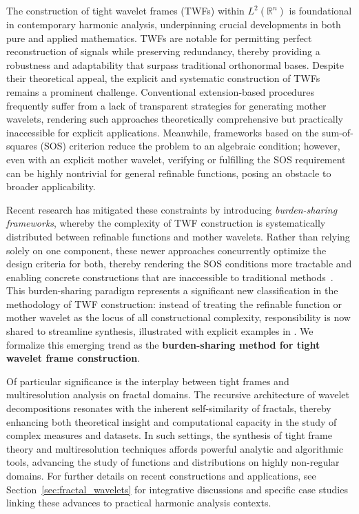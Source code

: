 \documentclass[sigconf]{acmart}
\begin{document}
The construction of tight wavelet frames (TWFs) within $L^2(\mathbb{R}^n)$ is foundational in contemporary harmonic analysis, underpinning crucial developments in both pure and applied mathematics. TWFs are notable for permitting perfect reconstruction of signals while preserving redundancy, thereby providing a robustness and adaptability that surpass traditional orthonormal bases. Despite their theoretical appeal, the explicit and systematic construction of TWFs remains a prominent challenge. Conventional extension-based procedures frequently suffer from a lack of transparent strategies for generating mother wavelets, rendering such approaches theoretically comprehensive but practically inaccessible for explicit applications. Meanwhile, frameworks based on the sum-of-squares (SOS) criterion reduce the problem to an algebraic condition; however, even with an explicit mother wavelet, verifying or fulfilling the SOS requirement can be highly nontrivial for general refinable functions, posing an obstacle to broader applicability.

Recent research has mitigated these constraints by introducing \emph{burden-sharing frameworks}, whereby the complexity of TWF construction is systematically distributed between refinable functions and mother wavelets. Rather than relying solely on one component, these newer approaches concurrently optimize the design criteria for both, thereby rendering the SOS conditions more tractable and enabling concrete constructions that are inaccessible to traditional methods~\cite{ref104}. This burden-sharing paradigm represents a significant new classification in the methodology of TWF construction: instead of treating the refinable function or mother wavelet as the locus of all constructional complexity, responsibility is now shared to streamline synthesis, illustrated with explicit examples in \cite{ref104}. We formalize this emerging trend as the \textbf{burden-sharing method for tight wavelet frame construction}.

Of particular significance is the interplay between tight frames and multiresolution analysis on fractal domains. The recursive architecture of wavelet decompositions resonates with the inherent self-similarity of fractals, thereby enhancing both theoretical insight and computational capacity in the study of complex measures and datasets. In such settings, the synthesis of tight frame theory and multiresolution techniques affords powerful analytic and algorithmic tools, advancing the study of functions and distributions on highly non-regular domains. For further details on recent constructions and applications, see Section~\ref{sec:fractal_wavelets} for integrative discussions and specific case studies linking these advances to practical harmonic analysis contexts.
\end{document}
